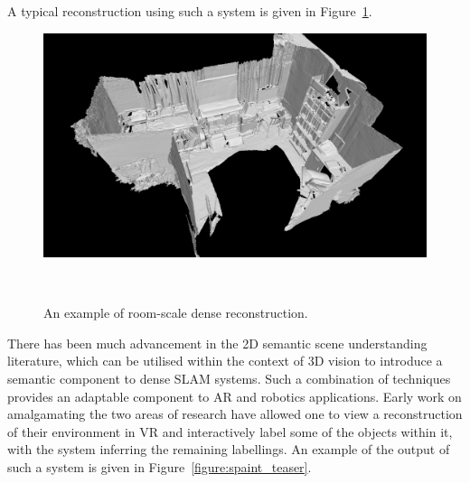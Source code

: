 A typical reconstruction using such a system is given in Figure~\ref{figure:room_recon_example}.
\begin{figure}[!htbp]
  \centering
  \includegraphics[width=.5\linewidth]{figures/intro/room_scene.png}
  \caption[Room Scale Dense Reconstruction]{An example of room-scale dense reconstruction.}
~\label{figure:room_recon_example}
\end{figure}

There has been much advancement in the 2D semantic scene understanding literature, which can be utilised within 
the context of 3D vision to introduce a semantic component to dense SLAM systems. Such a combination of techniques 
provides an adaptable component to AR and robotics applications. Early work on amalgamating the two areas of research 
have allowed one to view a reconstruction of their environment in VR and interactively label some of the objects within 
it, with the system inferring the remaining labellings. An example of the output of such a system is given 
in Figure~\ref{figure:spaint_teaser}.

